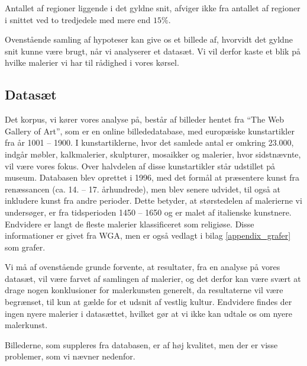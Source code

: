 {\begin{hypotese}
    Antallet af regioner liggende i det gyldne snit, afviger ikke fra
    antallet af regioner i snittet ved to tredjedele med mere end
    $15\%$.
	\label{hypo_15p}
\end{hypotese}

Ovenstående samling af hypoteser kan give os et billede af, hvorvidt det
gyldne snit kunne være brugt, når vi analyserer et datasæt. Vi vil
derfor kaste et blik på hvilke malerier vi har til rådighed i vores
kørsel.

\subsection{Datasæt}
Det korpus, vi kører vores analyse på, består af billeder hentet fra
``The Web Gallery of Art''\cite{wgahu}, som er en online billededatabase, med
europæiske kunstartikler fra år 1001 -- 1900. I kunstartiklerne, hvor
det samlede antal er omkring 23.000, indgår møbler, kalkmalerier,
skulpturer, mosaikker og malerier, hvor sidstnævnte, vil være vores
fokus. Over halvdelen af disse kunstartikler står udstillet på museum.
Databasen blev oprettet i 1996, med det formål at præsentere kunst fra
renæssancen (ca.  14. -- 17.  århundrede), men blev senere udvidet, til
også at inkludere kunst fra andre perioder. Dette betyder, at
størstedelen af malerierne vi undersøger, er fra tidsperioden 1450 --
1650 og er malet af italienske kunstnere. Endvidere er langt de fleste
malerier klassificeret som religiøse.  Disse informationer er givet fra
WGA, men er også vedlagt i bilag \ref{appendix_grafer} som
grafer.

Vi må af ovenstående grunde forvente, at resultater, fra en analyse på
vores datasæt, vil være farvet af samlingen af malerier, og det derfor
kan være svært at drage nogen konklusioner for malerkunsten generelt, da
resultaterne vil være begrænset, til kun at gælde for et udsnit af
vestlig kultur. Endvidere findes der ingen nyere malerier i datasættet,
hvilket gør at vi ikke kan udtale os om nyere malerkunst.

Billederne, som suppleres fra databasen, er af høj kvalitet, men der er
visse problemer, som vi nævner nedenfor.

}
